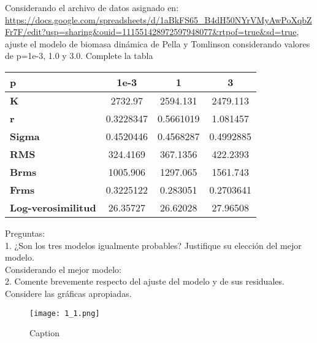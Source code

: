 \documentclass{uofa-eng-assignment}
\begin{document}
\maketitle

Considerando el archivo de datos asignado en:\\

\url{https://docs.google.com/spreadsheets/d/1aBkFS65_B4dH50NYrVMyAwPoXqbZFr7F/edit?usp=sharing&ouid=111551428972597948077&rtpof=true&sd=true}, ajuste el modelo de biomasa dinámica de Pella y Tomlinson considerando valores de p=1e-3, 1.0 y 3.0. Complete la tabla

\begin{table}[H]
\centering
\begin{tabular}{||l|c|c|c||}
\hline \hline
\textbf{p }                & \textbf{1e-3} & \textbf{1} &\textbf{3 }\\
\hline
\hline
\textbf{K }                &  2732.97    & 2594.131  & 2479.113  \\
\hline
\textbf{r }              &  0.3228347    &  0.5661019 & 1.081457  \\
\hline
\textbf{Sigma }            &  0.4520446    & 0.4568287  &  0.4992885 \\
\hline
\textbf{RMS }              &  324.4169    & 367.1356  & 422.2393  \\
\hline
\textbf{Brms }             & 1005.906     &  1297.065 & 1561.743  \\
\hline
\textbf{Frms }             & 0.3225122     & 0.283051  &  0.2703641 \\
\hline
\textbf{Log-verosimilitud }&  26.35727    &  26.62028 & 27.96508 \\
\hline
\end{tabular}
\end{table}

Preguntas: \\

1. ¿Son los tres modelos igualmente probables? Justifique su elección del mejor modelo. \\

Considerando el mejor modelo:\\

2. Comente brevemente respecto del ajuste del modelo y de sus residuales. Considere las gráficas apropiadas.\\

\begin{figure}[H]
    \centering
    \texttt{[image: 1\_1.png]}
    \caption{Caption}
    \label{fig:1_1}
\end{figure}
\end{document}
